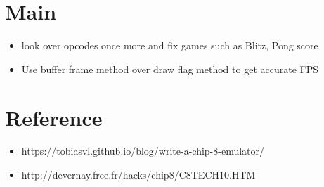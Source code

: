 \documentclass{article}
\begin{document}
\section*{Main}
\begin{itemize}
	\item look over opcodes once more and fix games such as Blitz, Pong score
	\item Use buffer frame method over draw flag method to get accurate FPS
\end{itemize}

\section*{Reference}
\begin{itemize}
	\item https://tobiasvl.github.io/blog/write-a-chip-8-emulator/
	\item http://devernay.free.fr/hacks/chip8/C8TECH10.HTM
\end{itemize}
\end{document}
